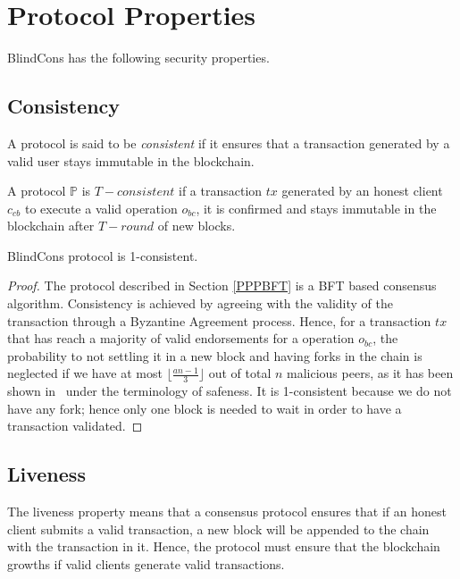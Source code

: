\documentclass[conference]{llncs}
\newcommand{\name}{BlindCons}
\begin{document}
\section{Protocol Properties}
\label{PROP}

\name{} has the following security properties.

\subsection{Consistency}
A protocol is said to be \emph{consistent} if it ensures that a transaction generated by a valid user stays immutable in the blockchain.

\begin{definition}
A protocol $\mathbb{P}$ is $T-consistent$ if a transaction $tx$ generated by an honest client $c_{cb}$ to execute a valid operation $o_{bc}$, it is confirmed and stays immutable in the blockchain after $T-round$ of new blocks.
\end{definition}

\begin{theorem} \name{} protocol is 1-consistent.
\end{theorem}

\begin{proof}
The protocol described in Section \ref{PPPBFT} is a BFT based consensus algorithm. Consistency is achieved by agreeing with the validity of the transaction through a Byzantine Agreement process. Hence, for a transaction $tx$ that has reach a majority of valid endorsements for a operation $o_{bc}$, the probability to not settling it in a new block and having forks in the chain is neglected if we have at most $\lfloor\frac{an-1}{3}\rfloor$ out of total $n$ malicious peers, as it has been shown in~\cite{castro1999practical,li2007beyond} under the terminology of safeness. It is 1-consistent because we do not have any fork; hence only one block is needed to wait in order to have a transaction validated.
\end{proof}

\subsection{Liveness}

The liveness property means that a consensus protocol ensures that if an honest client submits a valid transaction, a new block will be appended to the chain with the transaction in it. Hence, the protocol must ensure that the blockchain growths if valid clients generate valid transactions.
\end{document}
